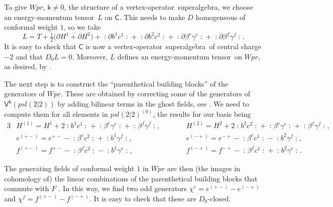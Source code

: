 \documentclass[10pt,a4paper]{amsart}
\numberwithin{equation}{section}
\newcommand{\pd}{\partial} %
\newcommand{\kk}{\mathsf{k}} %
\newcommand{\no}[1]{\mathopen{:} #1 \mathclose{:}} %
\newcommand{\alg}[1]{\mathfrak{#1}} %
\newcommand{\VOA}[1]{\mathsf{#1}} %
\newcommand{\SLSA}[3]{\alg{#1}_{#2 \vert #3}} %
\newcommand{\psl}{\SLSA{psl}{2}{2}}
\newcommand{\uaff}[2]{\VOA{V}^{#1}(#2)} %
\newcommand{\upsl}[1][\kk]{\uaff{#1}{\psl}} %
\newcommand{\uwalg}[2]{\VOA{W}^{#1}_{\mathrm{#2}}} %
\newcommand{\upr}[1][\kk]{\uwalg{#1}{pr}} %
\newcommand{\vo}{vertex-operator}
\newcommand{\svoa}{\vo\ superalgebra}
\newcommand{\emt}{energy-momentum tensor}
\def\smash#1{#1}
\def\psl{psl(2|2)}
\def\upr{Wpr}
\begin{document}
To give \smash{$\upr$}, $\kk\ne0$, the structure of a \svoa, we choose an \emt\ $L$ on $\VOA{C}$.
This needs to make $D$ homogeneous of conformal weight $1$, so we take
\[
	L = T + \tfrac{1}{2} \big(\pd H^1 + \pd H^2\big) + \no{\pd b^1 c^1} + \no{\pd b^2 c^2} + \no{\pd \beta^e \gamma^e} + \no{\pd \beta^f \gamma^f}.
\]
It is easy to check that $\VOA{C}$ is now a \svoa\ of central charge $-2$ and that $D_0 L = 0$.
Moreover, $L$ defines an \emt\ on \smash{$\upr$}, as desired, by \cite[Theorem~2.2]{KacQua03}.

The next step is to construct the ``parenthetical building blocks'' of the generators of \smash{$\upr$}.
These are obtained by correcting some of the generators of \smash{$\upsl$} by adding bilinear terms in the ghost fields, see \cite[equation~(2.4)]{KacQua03b}.
We need to compute them for all elements in \smash{$\psl^{(0)}$}, the results for our basis being
\begin{alignat}{3}
		& H^{(1)} = H^1 + 2\no{b^1c^1} + \no{\beta^e\gamma^e} + \no{\beta^f\gamma^f},\qquad&&
		H^{(2)} = H^2 + 2\no{b^2c^2} + \no{\beta^e\gamma^e} + \no{\beta^f\gamma^f}, &\nonumber\\
		&e^{(+-)} = e^{+-} - \no{\beta^ec^2} + \no{b^1\gamma^f},\qquad&&
		e^{(-+)} = e^{-+} - \no{\beta^ec^1} - \no{b^2\gamma^f}, &\nonumber\\
		&f^{(+-)} = f^{+-} - \no{\beta^fc^2} - \no{b^1\gamma^e},\qquad&&
		f^{(-+)} = f^{-+} - \no{\beta^fc^1} + \no{b^2\gamma^e}.&\label{eq:(KW)}
\end{alignat}

The generating fields of conformal weight $1$ in \smash{$\upr$} are then (the images in cohomology of) the linear combinations of the parenthetical building blocks that commute with $F$ \cite[Theorem~4.1]{KacQua03b}.
In this way, we find two odd generators
\smash{$
	\chi^e = e^{(+-)} - e^{(-+)}$} and \smash{$\chi^f = f^{(+-)} - f^{(-+)}$}.
It is easy to check that these are $D_0$-closed.
\end{document}
